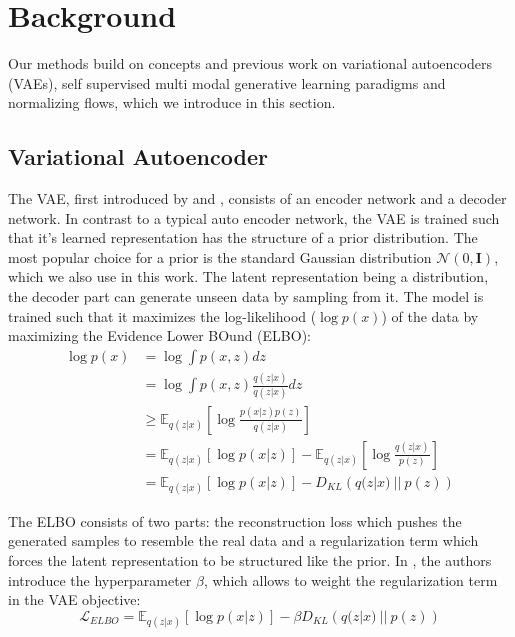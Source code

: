 \chapter{Background}
Our methods build on concepts and previous work on variational autoencoders (VAEs), self supervised multi modal generative learning paradigms and normalizing flows, which we introduce in this section.

\section{Variational Autoencoder}
\label{subsec:vae}
The VAE, first introduced by \cite{kingma_auto-encoding_2014} and \cite{rezende_stochastic_2014}, consists of an encoder network and a decoder network.
In contrast to a typical auto encoder network, the VAE is trained such that it's learned representation has the structure of a prior distribution.
The most popular choice for a prior is the standard Gaussian distribution $\mathcal{N}(0,\textbf{I})$, which we also use in this work.
The latent representation being a distribution, the decoder part can generate unseen data by sampling from it.
The model is trained such that it maximizes the log-likelihood ($\log p(x)$) of the data by maximizing the Evidence Lower BOund (ELBO):
\begin{equation}
    \label{vaeelbo}
    \begin{split}
        \log p(x) &= \log \int p(x,z) dz\\
        &=  \log \int p(x,z) \frac{q(z|x)}{q(z|x)}dz\\
        &\geq \mathbb{E} _{q(z|x)}[\log \frac{p(x|z)p(z)}{q(z|x)}]\\
        &= \mathbb{E} _{q(z|x)}[\log p(x|z)] - \mathbb{E} _{q(z|x)}[\log \frac{q(z|x)}{p(z)}]\\
        &= \mathbb{E} _{q(z|x)}[\log p(x|z)] - D_{KL}\left( q(z|x)\ ||\ p(z)\right)
    \end{split}
\end{equation}

The ELBO consists of two parts: the reconstruction loss which pushes the generated samples to resemble the real data and a regularization term which forces the latent representation to be structured like the prior.
In \cite{beta_vae}, the authors introduce the hyperparameter $\beta$, which allows to weight the regularization term in the VAE objective:
\begin{equation}
    \label{eq:vaeelbo}
    \mathcal{L}_{ELBO} = \mathbb{E} _{q(z|x)}[\log p(x|z)] - \beta D_{KL}\left( q(z|x)\ ||\ p(z)\right)
\end{equation}

